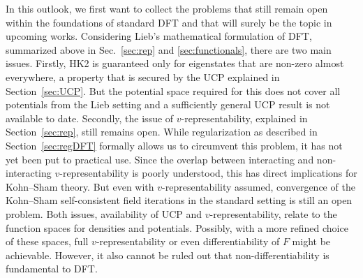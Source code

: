 \documentclass[journal=apcach,manuscript=article,layout=twocolumn]{achemso}
\newcommand{\changed}[1] {{ {#1}}} %
\begin{document}
\changed{In this outlook, we first want to collect the problems that still remain open within the foundations of standard DFT and that will surely be the topic in upcoming works.
Considering Lieb's mathematical formulation of DFT, summarized above in Sec.~\ref{sec:rep} and \ref{sec:functionals}, there are two main issues.
Firstly, HK2 is guaranteed only for eigenstates that are non-zero almost everywhere, a property that is secured by the UCP explained in Section~\ref{sec:UCP}. But the potential space required for this does not cover all potentials from the Lieb setting and a sufficiently general UCP result is not available to date. Secondly, the issue of $v$-representability, explained in Section~\ref{sec:rep}, still remains open. While regularization as described in Section~\ref{sec:regDFT} formally allows us to circumvent this problem, it has not yet been put to practical use. Since the overlap between interacting and non-interacting $v$-representability is poorly understood, this has direct implications for Kohn--Sham theory. But even with $v$-representability assumed, convergence of the Kohn--Sham self-consistent field iterations in the standard setting is still an open problem. Both issues, availability of UCP and $v$-representability, relate to the function spaces for densities and potentials. Possibly, with a more refined choice of these spaces, full $v$-representability or even differentiability of $F$ might be achievable. However, it also cannot be ruled out that non-differentiability is fundamental to DFT.
}
\end{document}
